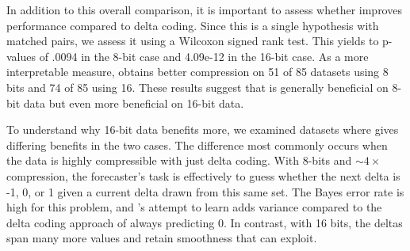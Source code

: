 In addition to this overall comparison, it is important to assess whether \fire improves performance compared to delta coding. Since this is a single hypothesis with matched pairs, we assess it using a Wilcoxon signed rank test. This yields to p-values of .0094 in the 8-bit case and 4.09e-12 in the 16-bit case. As a more interpretable measure, \fire obtains better compression on 51 of 85 datasets using 8 bits and 74 of 85 using 16. These results suggest that \fire is generally beneficial on 8-bit data but even more beneficial on 16-bit data.

To understand why 16-bit data benefits more, we examined datasets where \fire gives differing benefits in the two cases. The difference most commonly occurs when the data is highly compressible with just delta coding. With 8-bits and $\sim4\times$ compression, the forecaster's task is effectively to guess whether the next delta is -1, 0, or 1 given a current delta drawn from this same set. The Bayes error rate is high for this problem, and \justfire's attempt to learn adds variance compared to the delta coding approach of always predicting 0. In contrast, with 16 bits, the deltas span many more values and retain smoothness that \fire can exploit.







